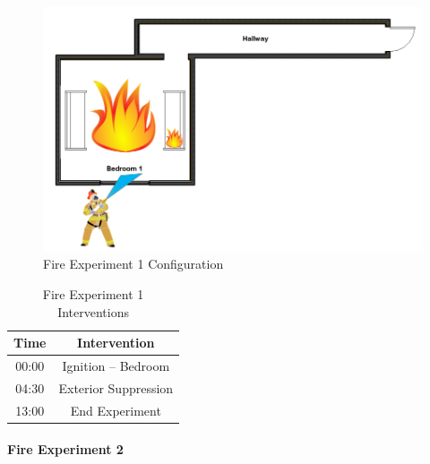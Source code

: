 \documentclass[12pt,oneside]{book}
\begin{document}

\begin{figure}[H]
	\centering
	\includegraphics[width=5in]{Howard_Exp_1.png}
	\caption{Fire Experiment 1 Configuration}
	\label{fig:Exp1Config}
\end{figure}

\begin{table}[H]
	\centering
	\caption{Fire Experiment 1 Interventions}
	\begin{tabular}{|c|c|} 
		\hline
		Time & Intervention \\ \hline \hline
		00:00 & Ignition -- Bedroom \\ \hline
		04:30 & Exterior Suppression \\ \hline
		13:00 & End Experiment\\ \hline
	\end{tabular}
	\label{Table:Exp1Interventions}
\end{table}

\clearpage

\paragraph{Fire Experiment 2} \mbox{}
\end{document}
